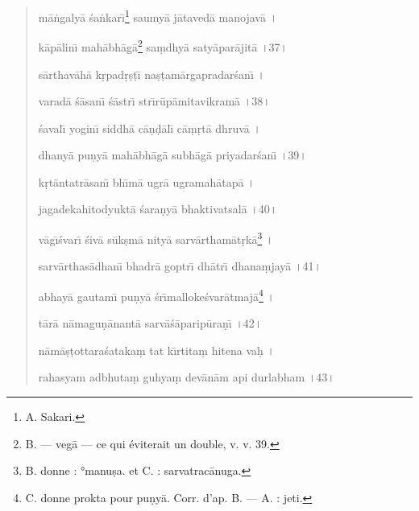 \documentclass[a4paper, 11pt, oneside, french, landscape, twocolumn]{article}
\begin{document}
\begin{quotation}
m\={a}\.{n}galy\={a} \'{s}a\.{n}kar\={\i}\footnote{A. Sakari.} saumy\={a} j\={a}taved\={a} manojav\={a} \texthindi{।}

k\={a}p\={a}lin\={\i} mah\={a}bh\={a}g\={a}\footnote{B. --- veg\={a} --- ce qui éviterait un double, v. v. 39.} sa\d{m}dhy\={a} saty\={a}par\={a}jit\={a} \texthindi{।}37\texthindi{।}

\bigskip

s\={a}rthav\={a}h\={a} k\d{r}pad\d{r}\d{s}\d{t}\={\i} na\d{s}\d{t}am\={a}rgapradar\'{s}an\={\i} \texthindi{।}

varad\={a} \'{s}\={a}san\={\i} \'{s}\={a}str\={\i} str\={\i}r\={u}p\={a}mitavikram\={a} \texthindi{।}38\texthindi{।}

\bigskip

\'{s}aval\={\i} yogin\={\i} siddh\={a} c\={a}\d{n}\d{d}\={a}l\={\i} c\={a}\d{m}\d{r}t\={a} dhruv\={a} \texthindi{।}

dhany\={a} pu\d{n}y\={a} mah\={a}bh\={a}g\={a} subh\={a}g\={a} priyadar\'{s}an\={\i} \texthindi{।}39\texthindi{।}

\bigskip

k\d{r}t\={a}ntatr\={a}san\={\i} bh\={\i}m\={a} ugr\={a} ugramah\={a}tap\={a} \texthindi{।}

jagadekahitodyukt\={a} \'{s}ara\d{n}y\={a} bhaktivatsal\={a} \texthindi{।}40\texthindi{।}

\bigskip

v\={a}g\={\i}\'{s}var\={\i} \'{s}iv\={a} s\={u}k\d{s}m\={a} nity\={a} sarv\={a}rtham\={a}t\d{r}k\={a}\footnote{B. donne : °manu\d{s}a. et C. : sarvatrac\={a}nuga.} \texthindi{।}

sarv\={a}rthas\={a}dhan\={\i} bhadr\={a} goptr\={\i} dh\={a}tr\={\i} dhana\d{m}jay\={a} \texthindi{।}41\texthindi{।}

\bigskip

abhay\={a} gautam\={\i} pu\d{n}y\={a} \'{s}r\={\i}malloke\'{s}var\={a}tmaj\={a}\footnote{C. donne prokta pour pu\d{n}y\={a}. Corr. d'ap. B. --- A. : jeti.} \texthindi{।}

t\={a}r\={a} n\={a}magu\d{n}\={a}nant\={a} sarv\={a}\'{s}\={a}parip\={u}ra\d{n}\={\i} \texthindi{।}42\texthindi{।}

\bigskip

n\={a}m\={a}\d{s}\d{t}ottara\'{s}ataka\d{m} tat k\={\i}rtita\d{m} hitena va\d{h} \texthindi{।}

rahasyam adbhuta\d{m} guhya\d{m} dev\={a}n\={a}m api durlabham \texthindi{।}43\texthindi{।}

\bigskip


\end{quotation}
\end{document}
